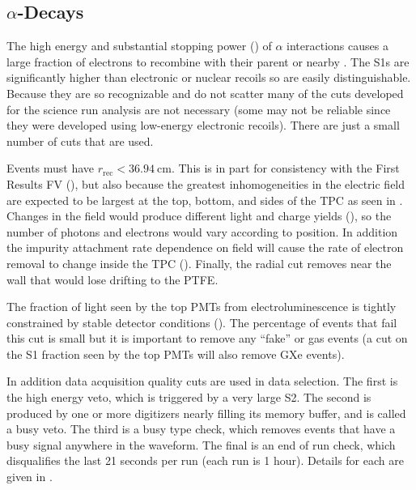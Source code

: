 \subsection{$\alpha$-Decays}
\label{subsec:electron_lifetimes_measurement_alphas}
The high energy and substantial stopping power () of $\alpha$ interactions causes a large fraction of
electrons to recombine with their parent or nearby .  The S1s are significantly higher than electronic or nuclear recoils so are
easily distinguishable.  Because they are so recognizable and do not scatter many of the cuts developed for the science run analysis are
not necessary (some may not be reliable since they were developed using low-energy electronic recoils).  There are just a small
number of cuts that are used.

Events must have $r_{\mathrm{rec}} < 36.94\ \mathrm{cm}$.  This is in part for consistency with the First Results FV
(), but also because the greatest inhomogeneities in the electric field are expected to be largest at the top,
bottom, and
sides of the TPC as seen in .  Changes in the field would produce different light and charge yields
(), so the number of photons and electrons would vary according to position.  In addition the impurity
attachment rate dependence on field will cause the rate of electron removal to change inside the TPC
().  Finally, the radial cut removes \alphadecays near the wall that would lose drifting
\electron to the PTFE.

The fraction of light seen by the top PMTs from electroluminescence is tightly constrained by stable detector conditions
(\eqnref{}).  The percentage of events that fail this cut is small but it is important to remove any
``fake'' or gas events (a cut on the S1 fraction seen by the top PMTs will also remove GXe events).

In addition data acquisition quality cuts are used in data selection.  The first is the high energy veto, which is triggered by a very
large S2.  The second is produced by one or more digitizers nearly filling its memory buffer, and is called a busy veto.  The third is
a busy type check, which removes events that have a busy signal anywhere in the waveform.  The final is an end of run check, which
disqualifies the last 21 seconds per run (each run is 1 hour).  Details for each are given in .

